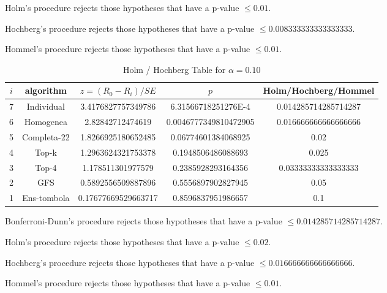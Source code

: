 \documentclass[a4paper,10pt]{article}
\begin{document}
\begin{landscape}
Holm's procedure rejects those hypotheses that have a p-value $\le0.01$.


Hochberg's procedure rejects those hypotheses that have a p-value $\le0.008333333333333333$.


Hommel's procedure rejects those hypotheses that have a p-value $\le0.01$.


\begin{table}[!htp]
\centering\tiny
\caption{Holm / Hochberg Table for $\alpha=0.10$}
\begin{tabular}{ccccc}
$i$&algorithm&$z=(R_0 - R_i)/SE$&$p$&Holm/Hochberg/Hommel\\
\hline
7&Individual&3.4176827757349786&6.31566718251276E-4&0.014285714285714287\\
6&Homogenea&2.82842712474619&0.0046777349810472905&0.016666666666666666\\
5&Completa-22&1.8266925180652485&0.06774601384068925&0.02\\
4&Top-k&1.2963624321753378&0.1948506486088693&0.025\\
3&Top-4&1.178511301977579&0.2385928293164356&0.03333333333333333\\
2&GFS&0.5892556509887896&0.5556897902827945&0.05\\
1&Ens-tombola&0.17677669529663717&0.8596837951986657&0.1\\
\hline
\end{tabular}
\end{table}
Bonferroni-Dunn's procedure rejects those hypotheses that have a p-value $\le0.014285714285714287$.


Holm's procedure rejects those hypotheses that have a p-value $\le0.02$.


Hochberg's procedure rejects those hypotheses that have a p-value $\le0.016666666666666666$.


Hommel's procedure rejects those hypotheses that have a p-value $\le0.01$.



\end{landscape}
\end{document}
